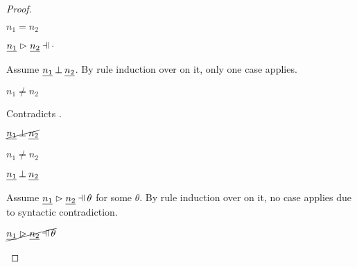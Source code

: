 \begin{proof}
\begin{byCases}
\begin{byCases}
        \begin{byCases}
        \item[n_1=n_2]
            \begin{pfsteps*}
            \item $n_1=n_2$  
            \item $\hpatmatch{\hnum{n_1}}{\hnum{n_2}}{\cdot}$ 
            \end{pfsteps*}
            Assume $\underline{n_1} \mathbin{\bot} \underline{n_2}$. By rule induction over  on it, only one case applies.
            \begin{byCases}
            \item[\text{(\ref{rule:NMNum})}]
                \begin{pfsteps*}
                \item $n_1\neq n_2$ 
                \end{pfsteps*}
                Contradicts .
            \end{byCases}
            \begin{pfsteps*}
            \item $\cancel{\underline{n_1} \mathbin{\bot} \underline{n_2}}$ 
            \end{pfsteps*}
        \item[n_1\neq n_2]
            \begin{pfsteps*}
            \item $n_1\neq n_2$  
            \item $\underline{n_1} \mathbin{\bot} \underline{n_2}$ 
            \end{pfsteps*}
            Assume $\hpatmatch{\hnum{n_1}}{\hnum{n_2}}{\theta}$ for some $\theta$. By rule induction over  on it, no case applies due to syntactic contradiction.
            \begin{pfsteps*}
            \item $\cancel{\hpatmatch{\hnum{n_1}}{\hnum{n_2}}{\theta}}$ 
            \end{pfsteps*}
        \end{byCases}
    \end{byCases}
\item[\text{(\ref{rule:PTInl})}]
    \begin{pfsteps*}

\end{pfsteps*}
\end{byCases}
\end{proof}
